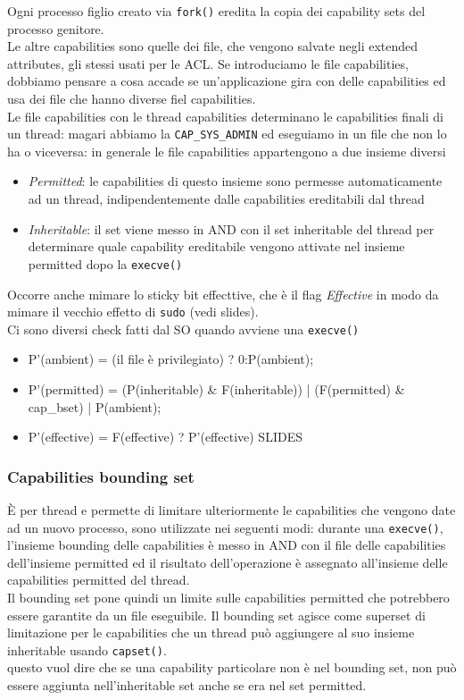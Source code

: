 \documentclass[12pt, oneside]{extbook} %
\begin{document}
Ogni processo figlio creato via \texttt{fork()} eredita la copia dei capability sets del processo genitore.\\Le altre capabilities sono quelle dei file, che vengono salvate negli extended attributes, gli stessi usati per le ACL. Se introduciamo le file capabilities, dobbiamo pensare a cosa accade se un'applicazione gira con delle capabilities ed usa dei file che hanno diverse fiel capabilities.\\Le file capabilities con le thread capabilities determinano le capabilities finali di un thread: magari abbiamo la \texttt{CAP\_SYS\_ADMIN} ed eseguiamo in un file che non lo ha o viceversa: in generale le file capabilities appartengono a due insieme diversi
\begin{itemize}
\item \textit{Permitted}: le capabilities di questo insieme sono permesse automaticamente ad un thread, indipendentemente dalle capabilities ereditabili dal thread
\item \textit{Inheritable}: il set viene messo in AND con il set inheritable del thread per determinare quale capability ereditabile vengono attivate nel insieme permitted dopo la \texttt{execve()}
\end{itemize}
Occorre anche mimare lo sticky bit effecttive, che è il flag \textit{Effective} in modo da mimare il vecchio effetto di \texttt{sudo} (vedi slides).\\Ci sono diversi check fatti dal SO quando avviene una \texttt{execve()}
\begin{itemize}
\item P'(ambient) = (il file è privilegiato) ? 0:P(ambient);
\item P'(permitted) = (P(inheritable) \& F(inheritable)) | (F(permitted) \& cap\_bset) | P(ambient);
\item P'(effective) = F(effective) ? P'(effective) SLIDES
\end{itemize}

\subsubsection{Capabilities bounding set} 
È per thread e permette di limitare ulteriormente le capabilities che vengono date ad un nuovo processo, sono utilizzate nei seguenti modi: durante una \texttt{execve()}, l'insieme bounding delle capabilities è messo in AND con il file delle capabilities dell'insieme permitted ed il risultato dell'operazione è  assegnato all'insieme delle capabilities permitted del thread.\\Il bounding set pone quindi un limite sulle capabilities permitted che potrebbero essere garantite da un file eseguibile. Il bounding set agisce come superset di limitazione per le capabilities che un thread può aggiungere al suo insieme inheritable usando \texttt{capset()}.\\questo vuol dire che se una capability particolare non è  nel bounding set, non può essere aggiunta nell'inheritable set anche se era nel set permitted.
\end{document}
